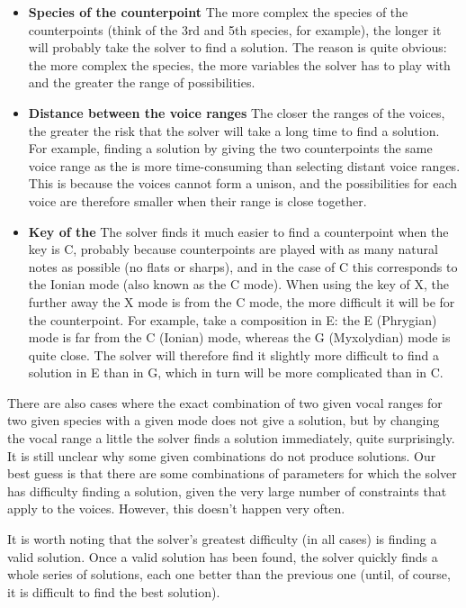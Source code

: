 \begin{itemize}
    \item \textbf{Species of the counterpoint} \textendash{} The more complex the species of the counterpoints (think of the 3rd and 5th species, for example), the longer it will probably take the solver to find a solution. The reason is quite obvious: the more complex the species, the more variables the solver has to play with and the greater the range of possibilities.  
    \item \textbf{Distance between the voice ranges} \textendash{}  The closer the ranges of the voices, the greater the risk that the solver will take a long time to find a solution. For example, finding a solution by giving the two counterpoints the same voice range as the \cfs is more time-consuming than selecting distant voice ranges. This is because the voices cannot form a unison, and the possibilities for each voice are therefore smaller when their range is close together. 
    \item \textbf{Key of the \cf} \textendash{} The solver finds it much easier to find a counterpoint when the key is C, probably because counterpoints are played with as many natural notes as possible (no flats or sharps), and in the case of C this corresponds to the Ionian mode (also known as the C mode). When using the key of X, the further away the X mode is from the C mode, the more difficult it will be for the counterpoint. For example, take a composition in E: the E (Phrygian) mode is far from the C (Ionian) mode, whereas the G (Myxolydian) mode is quite close. The solver will therefore find it slightly more difficult to find a solution in E than in G, which in turn will be more complicated than in C.
\end{itemize}
There are also cases where the exact combination of two given vocal ranges for two given species with a given mode does not give a solution, but by changing the vocal range a little the solver finds a solution immediately, quite surprisingly. It is still unclear why some given combinations do not produce solutions. Our best guess is that there are some combinations of parameters for which the solver has difficulty finding a solution, given the very large number of constraints that apply to the voices. However, this doesn't happen very often.

It is worth noting that the solver's greatest difficulty (in all cases) is finding a valid solution. Once a valid solution has been found, the solver quickly finds a whole series of solutions, each one better than the previous one (until, of course, it is difficult to find the best solution).


